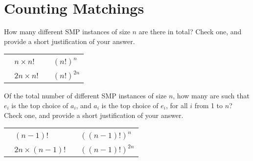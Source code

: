 \documentclass[11pt,fleqn]{exam}
\newcommand{\fillinMCmath}[1]{\begin{tikzpicture}\draw circle [radius=0.5em];\end{tikzpicture}\ #1}
\newcommand{\fillinMCmathsoln}[1]{\begin{tikzpicture}\draw[black, fill=blue] circle [radius=0.5em];\end{tikzpicture}\ #1}
\newif\ifsolutions\solutionsfalse
\begin{document}
    \section{Counting Matchings}
     \begin{questions}
\question[2]
How many different SMP instances of size $n$ are there in total? Check one, and provide a short justification of your answer.

\vspace{.1in}

\ifsolutions

\else

\begin{tabular}{ll}
\hspace{1in} \fillinMCmath{} $n \times n!$ \hspace*{1.2in}&  \fillinMCmath{} $(n!)^{n}$ \\
\hspace{1in} \fillinMCmath{} $2n \times n!$ \hspace*{1.2in}&  \fillinMCmath{} $(n!)^{2n}$
\end{tabular}

\fi

\vspace{.1in}

\question[2]
Of the total number of different SMP instances of size $n$, how many are such that $e_i$ is the top choice of $a_i$, and $a_i$ is the top choice of $e_i$, for all $i$ from 1 to $n$? Check one, and provide a short justification of your answer.

\vspace{.1in}

\ifsolutions

\else
\begin{tabular}{ll}
\hspace{1in} \fillinMCmath{} $(n-1)!$  \hspace*{.8in}&  \fillinMCmath{} $((n-1)!)^{n}$ \\
\hspace{1in} \fillinMCmath{} $2n \times (n-1)!$ \hspace*{.8in}&  \fillinMCmath{} $((n-1)!)^{2n}$
\end{tabular}

\fi
\end{questions}

\clearpage
\end{document}
